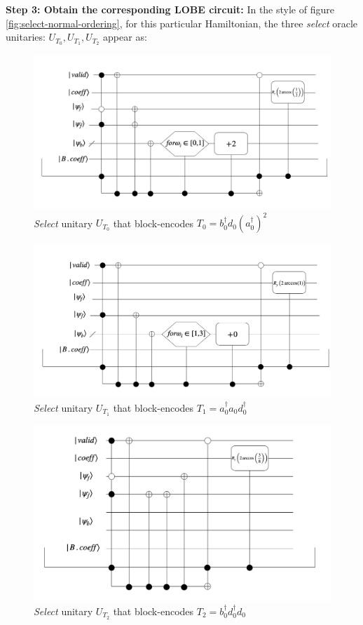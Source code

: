 \textbf{Step 3: Obtain the corresponding LOBE circuit:} In the style of figure \ref{fig:select-normal-ordering}, for this particular Hamiltonian, the three \textit{select} oracle unitaries: $U_{T_0}, U_{T_1}, U_{T_2}$ appear as:
\begin{figure}[h]
    \includegraphics[width = 0.7\linewidth]{figures/T0.png}
    \caption{\textit{Select} unitary $U_{T_0}$ that block-encodes $T_0 = b_0^\dagger d_0(a_0^\dagger)^2$}
\end{figure}
\begin{figure}[h]
    \includegraphics[width = 0.7\linewidth]{figures/T1.png}
    \caption{\textit{Select} unitary $U_{T_1}$ that block-encodes $T_1 = a_0^\dagger a_0 d_0^\dagger$}
\end{figure}
\begin{figure}[h]
    \includegraphics[width = 0.7\linewidth]{figures/T2.png}
    \caption{\textit{Select} unitary $U_{T_2}$ that block-encodes $T_2 = b_0^\dagger d_0^\dagger d_0$}
\end{figure}

